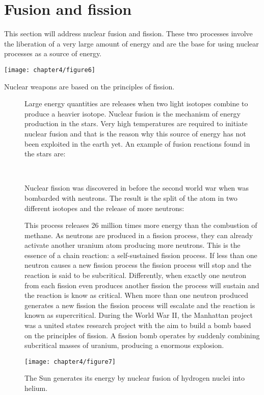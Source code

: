 \documentclass[main.tex]{subfiles}
\begin{document}
\section{Fusion and fission}
This section will address nuclear fusion and fission. These two processes involve the liberation of a very large amount of energy and are the base for using nuclear processes as a source of energy.
\begin{marginfigure}[-11cm]%
      \texttt{[image: chapter4/figure6]}
      \caption{Nuclear weapons are based on the principles of fission.}
	\end{marginfigure}%
\sloppy 
\begin{description}
\item[] Large energy quantities are releases when two light isotopes combine to produce a heavier isotope. Nuclear fusion is the mechanism of energy production in the stars. Very high temperatures are required to initiate nuclear fusion and that is the reason why this source of energy has not been exploited in the earth yet. An example of fusion reactions found in the stars are:
\begin{center}\\
\end{center}
\item[] Nuclear fission was discovered in before the second world war when  was bombarded with neutrons. The result is the split of the atom in two different isotopes and the release of more neutrons:
\begin{center}\end{center}
This process releases 26 million times more energy than the combustion of methane. As neutrons are produced in a fission process, they can already activate another uranium atom producing more neutrons. This is the essence of a chain reaction: a self-sustained fission process. If less than one neutron causes a new fission process the fission process will stop and the reaction is said to be subcritical. Differently, when exactly one neutron from each fission even produces another fission the process will sustain and the reaction is know as critical. When more than one neutron produced generates a new fission the fission process will escalate and the reaction is known as supercritical. During the World War II, the Manhattan project was a united states research project with the aim to build a bomb based on the principles of fission. A fission bomb operates by suddenly combining subcritical masses of uranium, producing a enormous explosion.
\begin{marginfigure}[-11cm]%
      \texttt{[image: chapter4/figure7]}
      \caption{The Sun generates its energy by nuclear fusion of hydrogen nuclei into helium.}
	\end{marginfigure}%


\end{description}
\end{document}
